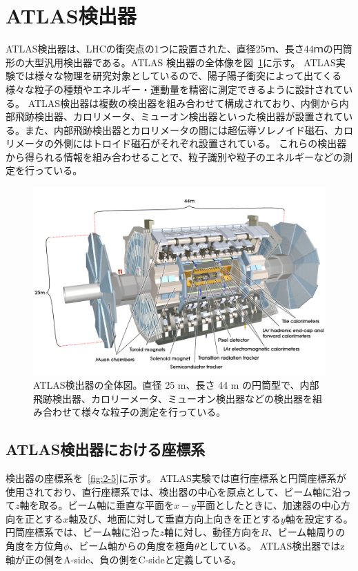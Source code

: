 \section{ATLAS検出器}\label{section2-2}

ATLAS検出器は、LHCの衝突点の1つに設置された、直径25ｍ、長さ44ｍの円筒形の大型汎用検出器である\cite{Aad:1129811}。ATLAS 検出器の全体像を図~\ref{fig:2-4}に示す。
ATLAS実験では様々な物理を研究対象としているので、陽子陽子衝突によって出てくる様々な粒子の種類やエネルギー・運動量を精密に測定できるように設計されている。
ATLAS検出器は複数の検出器を組み合わせて構成されており、内側から内部飛跡検出器、カロリメータ、ミューオン検出器といった検出器が設置されている。また、内部飛跡検出器とカロリメータの間には超伝導ソレノイド磁石、カロリメータの外側にはトロイド磁石がそれぞれ設置されている。
これらの検出器から得られる情報を組み合わせることで、粒子識別や粒子のエネルギーなどの測定を行っている。

\begin{figure}[tb]
  \centering
  \includegraphics[clip,width=12cm]{fig/2/0803012_01.jpg}
  \caption{ATLAS検出器の全体図\cite{Aad:1129811}。直径 25 m、長さ 44 m の円筒型で、内部飛跡検出器、カロリーメータ、ミューオン検出器などの検出器を組み合わせて様々な粒子の測定を行っている。}
  \label{fig:2-4}
\end{figure}

\subsection{ATLAS検出器における座標系}\label{section2-2-1}
検出器の座標系を~\ref{fig:2-5}に示す。
ATLAS実験では直行座標系と円筒座標系が使用されており、直行座標系では、検出器の中心を原点として、ビーム軸に沿って$z$軸を取る。ビーム軸に垂直な平面を$x-y$平面としたときに、加速器の中心方向を正とする$x$軸及び、地面に対して垂直方向上向きを正とする$y$軸を設定する。円筒座標系では、ビーム軸に沿った$z$軸に対し、動径方向を$R$、ビーム軸周りの角度を方位角$\phi$、ビーム軸からの角度を極角$\theta$としている。
ATLAS検出器ではz軸が正の側をA-side、負の側をC-sideと定義している。

